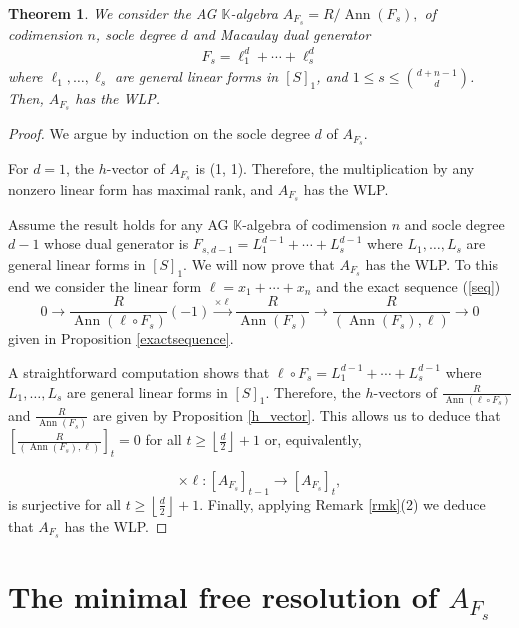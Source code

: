 \documentclass[12pt,twoside]{amsart}
\numberwithin{equation}{section} \hyphenation{semi-stable}
\newcommand{\K}{\mathbb{K}}
\DeclareMathOperator{\ann}{Ann}
\newtheorem{theorem}{Theorem}[section]
\theoremstyle{definition}
\begin{document}
\begin{theorem} \label{WLP_main}
We consider the AG $\K$-algebra $A_{F_{s}} = R/\operatorname{Ann}(F_{s}),$ of codimension $n$, socle degree $d$ and Macaulay dual generator 
\begin{eqnarray*}
F_{s}=\ell_1^d+\cdots+\ell_s^d
\end{eqnarray*}
where $\ell_1,\ldots,\ell_s$ are general linear forms in $[S]_1$, and $1 \le s \le \binom{d+n-1}{d}$.                 
Then, $A_{F_s}$ has the WLP. 
\end{theorem}
\begin{proof}
   We argue by induction on the socle degree $d$ of $A_{F_{s}}$.
   
    For $d = 1$, the $h$-vector of  $A_{F_s}$ is  (1, 1). Therefore, the multiplication by any nonzero linear form has maximal rank, and $A_{F_s}$ has the WLP.
    
Assume the result holds for any AG $\K$-algebra of codimension $n$ and socle degree $d-1$ whose dual generator is $ F_{s,d-1}=L_1^{d-1}+\cdots+L_s^{d-1}$ where 
$L_1,\dots,L_s$ are general linear forms in $[S]_1$.  We will now prove that $A_{F_s}$ has the WLP. To this end we consider the linear form $\ell =x_1+\cdots +x_n$ and the exact sequence  (\ref{seq})
\begin{equation}
\label{seq1}
0\longrightarrow \frac{R}{\ann(\ell \circ F_s)}(-1)\xrightarrow[]{\times\ell} \frac{R}{\ann (F_s)}\longrightarrow \frac{R}{(\ann(F_s),\ell)}\longrightarrow 0
\end{equation}
given in Proposition \ref{exactsequence}. 

A straightforward computation shows that $\ell \circ F_s=L_1^{d-1}+\cdots+L_s^{d-1}$ where 
$L_1,\dots,L_s$ are general linear forms in $[S]_1$. Therefore, the $h$-vectors of $\frac{R}{\ann(\ell \circ F_s)}$ and $\frac{R}{\ann (F_s)}$ are given by Proposition \ref{h_vector}. This  allows us to deduce that $\left[\frac{R}{(\ann(F_s),\ell)}\right]_t=0$ for all $t\ge \left\lfloor \frac{d}{2} \right\rfloor+1$ or, equivalently,

$$
\times \ell : [A_{F_s}]_{t-1} \longrightarrow [A_{F_s}]_t,
$$
is surjective for all  $t\ge \left\lfloor \frac{d}{2} \right\rfloor+1$. Finally, applying Remark \ref{rmk}(2) we deduce that $A_{F_s}$ has the WLP.
\end{proof}



\section{The minimal free resolution of $A_{F_s}$}\label{section4}
\end{document}
